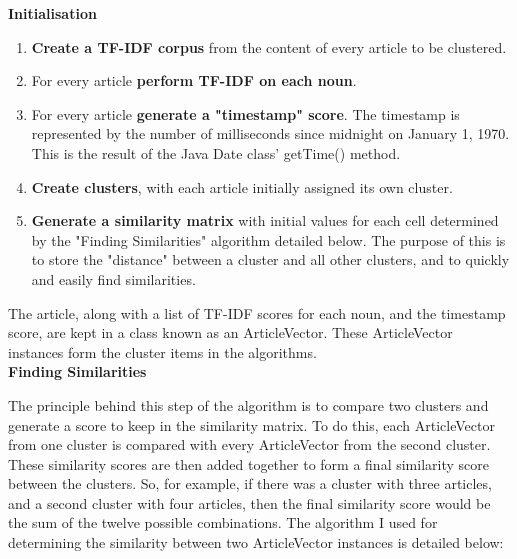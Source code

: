 \documentclass[12pt]{article}
\begin{document}
\textbf{Initialisation}

\begin{enumerate}
	\item \textbf{Create a TF-IDF corpus} from the content of every article to be clustered. 
	\item For every article \textbf{perform TF-IDF on each noun}. 
	\item For every article \textbf{generate a "timestamp" score}. The timestamp is represented by the number of milliseconds since midnight on January 1, 1970. This is the result of the Java Date class' getTime() method.
	\item \textbf{Create clusters}, with each article initially assigned its own cluster. 
	\item \textbf{Generate a similarity matrix} with initial values for each cell determined by the "Finding Similarities" algorithm detailed below. The purpose of this is to store the "distance" between a cluster and all other clusters, and to quickly and easily find similarities. 
\end{enumerate}

The article, along with a list of TF-IDF scores for each noun, and the timestamp score, are kept in a class known as an ArticleVector. These ArticleVector instances form the cluster items in the algorithms. \\

\textbf{Finding Similarities}

The principle behind this step of the algorithm is to compare two clusters and generate a score to keep in the similarity matrix. To do this, each ArticleVector from one cluster is compared with every ArticleVector from the second cluster. These similarity scores are then added together to form a final similarity score between the clusters. So, for example, if there was a cluster with three articles, and a second cluster with four articles, then the final similarity score would be the sum of the twelve possible combinations. The algorithm I used for determining the similarity between two ArticleVector instances is detailed below: \\
\end{document}
